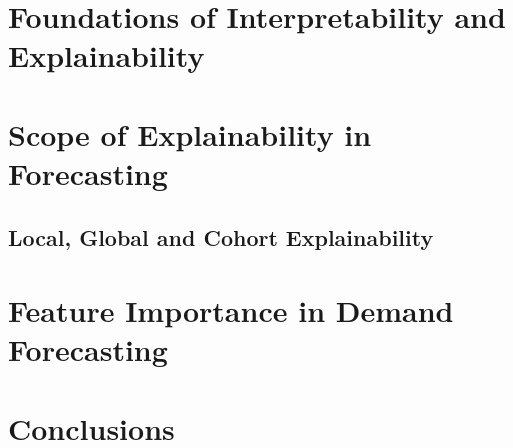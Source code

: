 
\section{Foundations of Interpretability and Explainability}
\label{sec:interpretability_explainability}



\section{Scope of Explainability in Forecasting}
\label{sec:scope_explainability}


\subsection{Local, Global and Cohort Explainability}
\label{subsec:local_global_cohort_explainability}


\section{Feature Importance in Demand Forecasting}
\label{sec:feature_importance}
%






\section{Conclusions}
\label{sec:interpretability_explainability_conclusions}